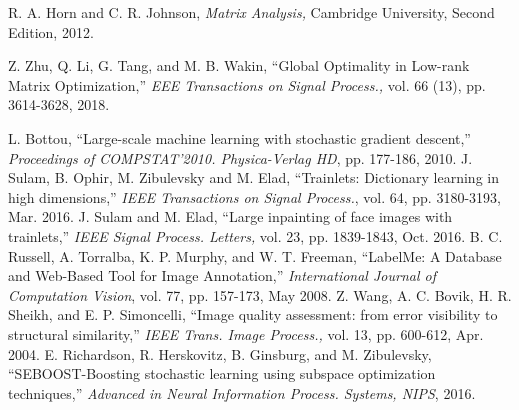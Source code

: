 \documentclass[final,5p,times,twocolumn]{elsarticle}
\begin{document}
\begin{thebibliography}{255}
	R. A. Horn and C. R. Johnson, {\it Matrix Analysis,} Cambridge University, Second Edition, 2012.

Z. Zhu, Q. Li, G. Tang, and M. B. Wakin, ``Global Optimality in Low-rank Matrix Optimization,''  {\it EEE Transactions on Signal Process.,} vol. 66 (13), pp.  3614-3628,  2018.

	L. Bottou, ``Large-scale machine learning with stochastic gradient descent,'' {\it Proceedings of COMPSTAT'2010. Physica-Verlag HD}, pp. 177-186, 2010.
	 J. Sulam, B. Ophir, M. Zibulevsky and M. Elad, ``Trainlets: Dictionary learning in high dimensions,'' {\it IEEE Transactions on Signal Process.}, vol. 64, pp. 3180-3193, Mar. 2016.
	 J. Sulam and M. Elad, ``Large inpainting of face images with trainlets,'' {\it IEEE Signal Process. Letters,} vol. 23, pp. 1839-1843, Oct. 2016.
	B. C. Russell, A. Torralba, K. P. Murphy, and W. T. Freeman, ``LabelMe: A Database and Web-Based Tool for Image Annotation,'' {\it International Journal of Computation Vision}, vol. 77, pp. 157-173, May 2008.
	Z. Wang, A. C. Bovik, H. R. Sheikh, and E. P. Simoncelli, ``Image quality assessment: from error visibility to structural similarity,'' {\it IEEE Trans. Image Process.,} vol. 13, pp. 600-612, Apr. 2004.
	E. Richardson, R. Herskovitz, B. Ginsburg, and M. Zibulevsky, ``SEBOOST-Boosting stochastic learning using subspace optimization techniques,'' {\it Advanced in Neural Information Process. Systems, NIPS}, 2016.
\end{thebibliography}
\end{document}
